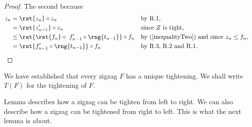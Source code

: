 {\begin{proof}
The second  because
\begin{align*}
 z_n &= \rst{z_n} \circ z_n
         &&\mbox{by R.1,}\\        
     &=  \rst{z'_{n-1}} \circ z_n 
         &&\mbox{since $Z$ is tight,}\\
     &\leq  \rst{\rst{f_n} \circ\ f'_{n-1} \circ \rng{t_{n-1}}} \circ f_n
         &&\mbox{by (\ref{inequalityTwo}) and since $z_n \leq f_n$,} \\
         &= \rst{f'_{n-1} \circ \rng{t_{n-1}}} \circ f_n
         && \mbox{by R.3, R.2 and R.1.}
\end{align*}
\end{proof}
} %
We have established that every zigzag $F$ has a unique tightening. 
We shall write $T(F)$ for the tightening of $F$. 

Lemma  describes how a zigzag can be tighten from left to right. We can also describe how a zigzag can be
tightened from right to left. This is what the next lemma is about.
\iffalse
\newcommand{\tightTail}
  {\rst{f'_1 \circ \rng{f_1}} \circ f_2,\;
  f'_2,...f_{n-2},f'_{n-1}, f_n
  }      

